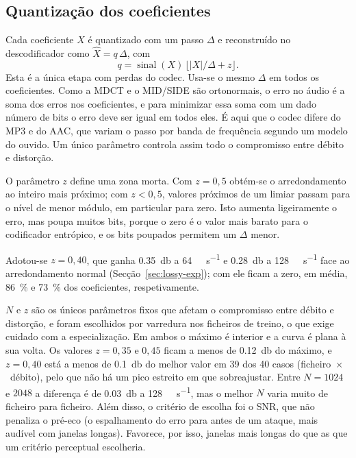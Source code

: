 \documentclass[a4paper,11pt]{article}
\begin{document}
\subsection{Quantização dos coeficientes}
\label{sec:lossy-quant}
Cada coeficiente $X$ é quantizado com um passo $\Delta$ e reconstruído no
descodificador como $\hat{X} = q\,\Delta$, com
\begin{equation}
  q = \operatorname{sinal}(X)\,\big\lfloor |X|/\Delta + z \big\rfloor .
\end{equation}
Esta é a única etapa com perdas do codec. Usa-se o mesmo $\Delta$ em todos os
coeficientes. Como a MDCT e o MID/SIDE são ortonormais, o erro no áudio é a
soma dos erros nos coeficientes, e para minimizar essa soma com um dado número
de bits o erro deve ser igual em todos eles. É aqui que o codec
difere do MP3 e do AAC, que variam o passo por banda de frequência segundo um
modelo do ouvido. Um único parâmetro controla assim todo o compromisso entre
débito e distorção.

O parâmetro $z$ define uma zona morta. Com $z = 0{,}5$ obtém-se o
arredondamento ao inteiro mais próximo; com $z < 0{,}5$, valores próximos de um
limiar passam para o nível de menor módulo, em particular para zero. Isto
aumenta ligeiramente o erro, mas poupa muitos bits, porque o zero é o valor
mais barato para o codificador entrópico, e os bits poupados permitem um
$\Delta$ menor.

Adotou-se $z = 0{,}40$, que ganha \SI{0,35}{\decibel} a
\SI{64}{\kilo\bit\per\second} e \SI{0,28}{\decibel} a
\SI{128}{\kilo\bit\per\second} face ao arredondamento normal
(Secção~\ref{sec:lossy-exp}); com ele ficam a zero, em média,
\SI{86}{\percent} e \SI{73}{\percent} dos coeficientes, respetivamente.

$N$ e $z$ são os únicos parâmetros fixos que afetam o compromisso entre débito
e distorção, e foram escolhidos por
varredura nos ficheiros de treino, o que exige cuidado com a especialização. Em
ambos o máximo é interior e a curva é plana à sua volta. Os valores $z = 0{,}35$ e $0{,}45$
ficam a menos de \SI{0,12}{\decibel} do máximo, e $z = 0{,}40$ está a menos de
\SI{0,1}{\decibel} do melhor valor em 39 dos 40 casos (ficheiro~$\times$~débito),
pelo que não há um pico estreito em que sobreajustar. Entre $N = 1024$ e $2048$ a
diferença é de \SI{0,03}{\decibel} a \SI{128}{\kilo\bit\per\second}, mas o melhor
$N$ varia muito de ficheiro para ficheiro. Além disso, o critério de escolha foi o
SNR, que não penaliza o pré-eco (o espalhamento do erro para antes de um ataque,
mais audível com janelas longas). Favorece, por isso, janelas mais longas do que
as que um critério perceptual escolheria.
\end{document}
